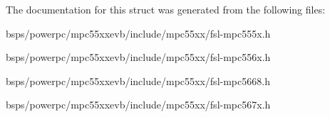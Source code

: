 The documentation for this struct was generated from the following files\+:\begin{DoxyCompactItemize}
\item 
bsps/powerpc/mpc55xxevb/include/mpc55xx/fsl-\/mpc555x.\+h\item 
bsps/powerpc/mpc55xxevb/include/mpc55xx/fsl-\/mpc556x.\+h\item 
bsps/powerpc/mpc55xxevb/include/mpc55xx/fsl-\/mpc5668.\+h\item 
bsps/powerpc/mpc55xxevb/include/mpc55xx/fsl-\/mpc567x.\+h\end{DoxyCompactItemize}
